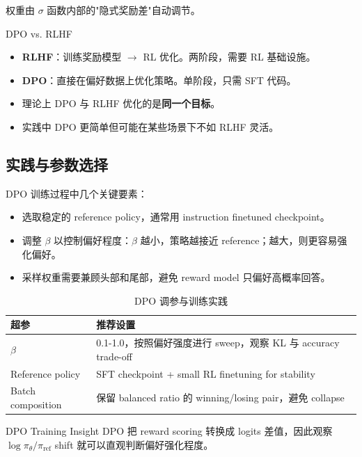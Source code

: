 \documentclass[a4paper]{article}
\begin{document}
权重由 $\sigma$ 函数内部的"隐式奖励差"自动调节。

\begin{knowledgebox}{DPO vs. RLHF}
\begin{itemize}
    \item \textbf{RLHF}：训练奖励模型 $\to$ RL 优化。两阶段，需要 RL 基础设施。
    \item \textbf{DPO}：直接在偏好数据上优化策略。单阶段，只需 SFT 代码。
    \item 理论上 DPO 与 RLHF 优化的是\textbf{同一个目标}。
    \item 实践中 DPO 更简单但可能在某些场景下不如 RLHF 灵活。
\end{itemize}
\end{knowledgebox}

\subsection{实践与参数选择}

DPO 训练过程中几个关键要素：
\begin{itemize}
    \item 选取稳定的 reference policy，通常用 instruction finetuned checkpoint。
    \item 调整 $\beta$ 以控制偏好程度：$\beta$ 越小，策略越接近 reference；越大，则更容易强化偏好。
    \item 采样权重需要兼顾头部和尾部，避免 reward model 只偏好高概率回答。
\end{itemize}

\begin{table}[H]
\centering
\begin{tabular}{p{} p{}}
\toprule
超参 & 推荐设置 \\
\midrule
$\beta$ & 0.1-1.0，按照偏好强度进行 sweep，观察 KL 与 accuracy trade-off \\
Reference policy & SFT checkpoint + small RL finetuning for stability \\
Batch composition & 保留 balanced ratio 的 winning/losing pair，避免 collapse \\
\bottomrule
\end{tabular}
\caption{DPO 调参与训练实践}
\end{table}

\begin{knowledgebox}{DPO Training Insight}
DPO 把 reward scoring 转换成 logits 差值，因此观察 $\log \pi_\theta / \pi_{\mathrm{ref}}$ shift 就可以直观判断偏好强化程度。
\end{knowledgebox}
\end{document}
